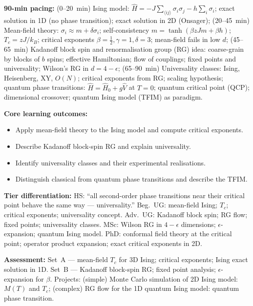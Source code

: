 \documentclass[11pt,a4paper]{article}
\begin{document}
\medskip

\begin{tcolorbox}[modulebox, title={Module~II.7 --- Lecture L09: Phase Transitions II --- Ising Model and Renormalisation Group}]
\textbf{90-min pacing:} (0--20~min) Ising model: $\hat{H}=-J\sum_{\langle ij\rangle}\sigma_i\sigma_j-h\sum_i\sigma_i$; exact solution in 1D (no phase transition); exact solution in 2D (Onsager); (20--45~min) Mean-field theory: $\sigma_i\approx m+\delta\sigma_i$; self-consistency $m=\tanh(\beta zJm+\beta h)$; $T_c=zJ/k_B$; critical exponents $\beta=\tfrac{1}{2},\gamma=1,\delta=3$; mean-field fails in low $d$; (45--65~min) Kadanoff block spin and renormalisation group (RG) idea: coarse-grain by blocks of $b$ spins; effective Hamiltonian; flow of couplings; fixed points and universality; Wilson's RG in $d=4-\epsilon$; (65--90~min) Universality classes: Ising, Heisenberg, XY, $O(N)$; critical exponents from RG; scaling hypothesis; quantum phase transitions: $\hat{H}=\hat{H}_0+g\hat{V}$ at $T=0$; quantum critical point (QCP); dimensional crossover; quantum Ising model (TFIM) as paradigm.

\medskip\textbf{Core learning outcomes:}
\begin{itemize}[leftmargin=1.4em,topsep=2pt,itemsep=1pt]
  \item Apply mean-field theory to the Ising model and compute critical exponents.
  \item Describe Kadanoff block-spin RG and explain universality.
  \item Identify universality classes and their experimental realisations.
  \item Distinguish classical from quantum phase transitions and describe the TFIM.
\end{itemize}

\medskip\textbf{Tier differentiation:}
HS: ``all second-order phase transitions near their critical point behave the same way --- universality.''
Beg.\ UG: mean-field Ising; $T_c$; critical exponents; universality concept.
Adv.\ UG: Kadanoff block spin; RG flow; fixed points; universality classes.
MSc: Wilson RG in $4-\epsilon$ dimensions; $\epsilon$-expansion; quantum Ising model.
PhD: conformal field theory at the critical point; operator product expansion; exact critical exponents in 2D.

\medskip\textbf{Assessment:}
Set~A --- mean-field $T_c$ for 3D Ising; critical exponents; Ising exact solution in 1D.
Set~B --- Kadanoff block-spin RG; fixed point analysis; $\epsilon$-expansion for $\beta$.
Projects: (simple) Monte Carlo simulation of 2D Ising model: $M(T)$ and $T_c$;
(complex) RG flow for the 1D quantum Ising model: quantum phase transition.
\end{tcolorbox}
\end{document}
